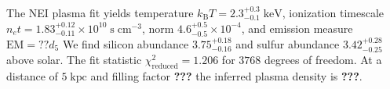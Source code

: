 \documentclass[preprint2,tighten,trackchanges]{aastex6}
\newcommand*{\mt}{\mathrm}
\newcommand*{\unit}[1]{\;\mt{#1}}  %
\newcommand*{\TauUnits}{\unit{s\;cm^{-3}}}
\newcommand*{\kB}{k_{\mathrm{B}}}
\newcommand*{\EM}{\mathrm{EM}}  %
\begin{document}
\begin{figure*}[]
    \label{fig:src-bkg-fits}  %
\end{figure*}

The NEI plasma fit yields temperature $\kB T = 2.3^{+0.3}_{-0.1} \unit{keV}$,
ionization timescale $n_e t = 1.83^{+0.12}_{-0.11} \times 10^{10} \TauUnits$,
norm $4.6^{+0.5}_{-0.5} \times 10^{-4}$,
and emission measure $\EM = ?? d_{5}$  %
We find silicon abundance $3.75^{+0.18}_{-0.16}$
and sulfur abundance $3.42^{+0.28}_{-0.25}$ above solar.
The fit statistic $\chi^2_{\mathrm{reduced}} = 1.206$ for $3768$ degrees of
freedom.
At a distance of $5 \unit{kpc}$ and filling factor \textbf{???} %
the inferred plasma density is \textbf{???}.  %

\end{document}
